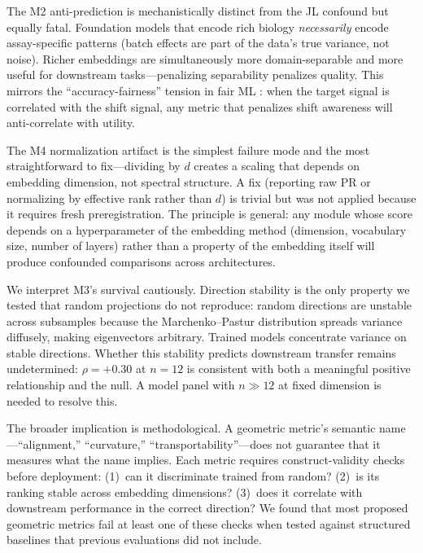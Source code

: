 \documentclass[9pt,lineno]{elife}
\begin{document}
The M2 anti-prediction is mechanistically distinct from the JL confound but equally fatal. Foundation models that encode rich biology \emph{necessarily} encode assay-specific patterns (batch effects are part of the data's true variance, not noise). Richer embeddings are simultaneously more domain-separable and more useful for downstream tasks---penalizing separability penalizes quality. This mirrors the ``accuracy-fairness'' tension in fair ML \citep{chouldechova2017impossibility}: when the target signal is correlated with the shift signal, any metric that penalizes shift awareness will anti-correlate with utility.

The M4 normalization artifact is the simplest failure mode and the most straightforward to fix---dividing by $d$ creates a scaling that depends on embedding dimension, not spectral structure. A fix (reporting raw PR or normalizing by effective rank rather than $d$) is trivial but was not applied because it requires fresh preregistration. The principle is general: any module whose score depends on a hyperparameter of the embedding method (dimension, vocabulary size, number of layers) rather than a property of the embedding itself will produce confounded comparisons across architectures.

We interpret M3's survival cautiously. Direction stability is the only property we tested that random projections do not reproduce: random directions are unstable across subsamples because the Marchenko--Pastur distribution spreads variance diffusely, making eigenvectors arbitrary. Trained models concentrate variance on stable directions. Whether this stability predicts downstream transfer remains undetermined: $\rho = +0.30$ at $n = 12$ is consistent with both a meaningful positive relationship and the null. A model panel with $n \gg 12$ at fixed dimension is needed to resolve this.

The broader implication is methodological. A geometric metric's semantic name---``alignment,'' ``curvature,'' ``transportability''---does not guarantee that it measures what the name implies. Each metric requires construct-validity checks before deployment: (1)~can it discriminate trained from random? (2)~is its ranking stable across embedding dimensions? (3)~does it correlate with downstream performance in the correct direction? We found that most proposed geometric metrics fail at least one of these checks when tested against structured baselines that previous evaluations did not include.
\end{document}
